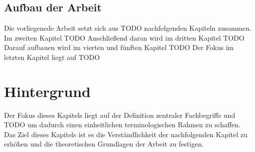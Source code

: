 \documentclass{article}
\begin{document}
    \subsection{Aufbau der Arbeit}
    Die vorliegenede Arbeit setzt sich aus TODO nachfolgenden Kapiteln zusammen. 
    Im zweiten Kapitel TODO
    Anschließend daran wird im dritten Kapitel TODO
    Darauf aufbauen wird im vierten und fünften Kapitel TODO
    Der Fokus im letzten Kapitel liegt auf TODO 
    \newpage
    \section{Hintergrund}
    Der Fokus dieses Kapitels liegt auf der Definition zentraler Fachbegriffe und TODO um dadurch einen einheitlichen terminologischen Rahmen zu schaffen. 
    Das Ziel dieses Kapitels ist es die Verständlichkeit der nachfolgenden Kapitel zu erhöhen und die theoretischen Grundlagen der Arbeit zu festigen.
\end{document}
